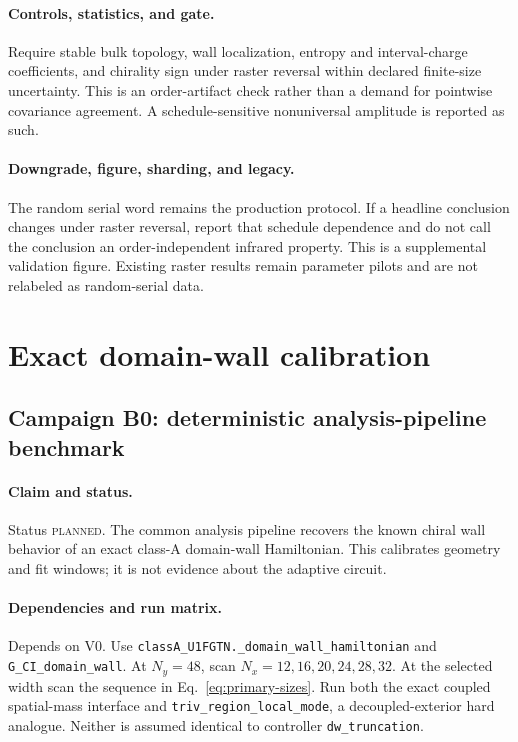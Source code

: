 \documentclass[aps,prx,onecolumn,nofootinbib,superscriptaddress,longbibliography]{revtex4-2}
\newcommand{\code}[1]{\texttt{#1}}
\newcommand{\planned}{\textsc{planned}}
\begin{document}
\paragraph{Controls, statistics, and gate.}
Require stable bulk topology, wall localization, entropy and interval-charge coefficients,
and chirality sign under raster reversal within declared finite-size uncertainty.  This is
an order-artifact check rather than a demand for pointwise covariance agreement.  A
schedule-sensitive nonuniversal amplitude is reported as such.

\paragraph{Downgrade, figure, sharding, and legacy.}
The random serial word remains the production protocol.  If a headline conclusion changes
under raster reversal, report that schedule dependence and do not call the conclusion an
order-independent infrared property.  This is a supplemental validation figure.  Existing
raster results remain parameter pilots and are not relabeled as random-serial data.

\section{Exact domain-wall calibration}

\subsection{Campaign B0: deterministic analysis-pipeline benchmark}
\paragraph{Claim and status.}
Status \planned.  The common analysis pipeline recovers the known chiral wall behavior of
an exact class-A domain-wall Hamiltonian.  This calibrates geometry and fit windows; it is
not evidence about the adaptive circuit.

\paragraph{Dependencies and run matrix.}
Depends on V0.  Use \code{classA\_U1FGTN.\_domain\_wall\_hamiltonian} and
\code{G\_CI\_domain\_wall}.  At $N_y=48$, scan
$N_x=12,16,20,24,28,32$.  At the selected width scan the sequence in
Eq.~\eqref{eq:primary-sizes}.  Run both the exact coupled spatial-mass interface and
\code{triv\_region\_local\_mode}, a decoupled-exterior hard analogue.  Neither is assumed
identical to controller \code{dw\_truncation}.
\end{document}
